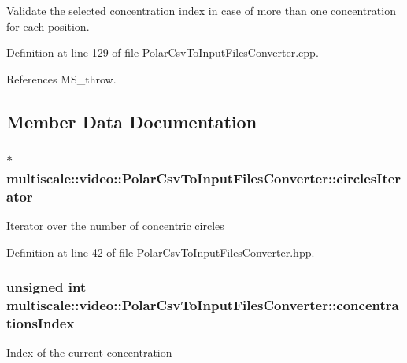 Validate the selected concentration index in case of more than one concentration for each position. 



Definition at line 129 of file Polar\-Csv\-To\-Input\-Files\-Converter.\-cpp.



References M\-S\-\_\-throw.



\subsection{Member Data Documentation}
\hypertarget{classmultiscale_1_1video_1_1PolarCsvToInputFilesConverter_ad4cf12c7f3951f0bb388939797cbcc0c}{
\subsubsection[{circles\-Iterator}]{$\ast$ multiscale\-::video\-::\-Polar\-Csv\-To\-Input\-Files\-Converter\-::circles\-Iterator\hspace{0.3cm}{\ttfamily [private]}}}\label{classmultiscale_1_1video_1_1PolarCsvToInputFilesConverter_ad4cf12c7f3951f0bb388939797cbcc0c}
Iterator over the number of concentric circles 

Definition at line 42 of file Polar\-Csv\-To\-Input\-Files\-Converter.\-hpp.

\hypertarget{classmultiscale_1_1video_1_1PolarCsvToInputFilesConverter_afd9f17e6ba2dc46b920ab28538278362}{
\subsubsection[{concentrations\-Index}]{\setlength{\rightskip}{0pt plus 5cm}unsigned int multiscale\-::video\-::\-Polar\-Csv\-To\-Input\-Files\-Converter\-::concentrations\-Index\hspace{0.3cm}{\ttfamily [private]}}}\label{classmultiscale_1_1video_1_1PolarCsvToInputFilesConverter_afd9f17e6ba2dc46b920ab28538278362}
Index of the current concentration 

